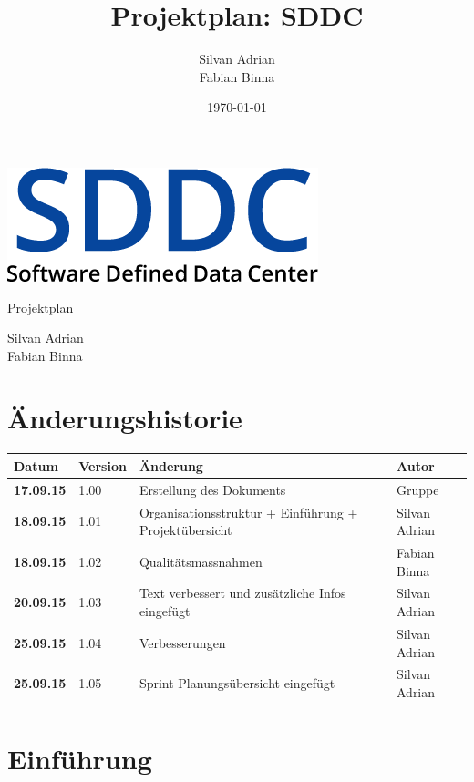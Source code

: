 \documentclass[11pt]{scrartcl}
\title{Projektplan: SDDC}
\author{Silvan Adrian \\ Fabian Binna}
\date{\today{}}
\begin{document}
\def\arraystretch{1.5}
\begin{titlepage}
\begin{center}
\vspace{10em}
\includegraphics[scale=2]{SDDC}
\vspace{10em}
\end{center}
\begin{center}
\huge {Projektplan}
\end{center}
\begin{center}
\vspace{10em}
\LARGE {Silvan Adrian} \\
\LARGE {Fabian Binna}
\end{center}

\end{titlepage}

\newpage
\section{Änderungshistorie}
\begin{tabularx}{\textwidth}{l l X l}
\textbf{Datum} & \textbf{Version} & \textbf{Änderung}  & \textbf{Autor} \\
\hline
\textbf{17.09.15} & 1.00 & Erstellung des Dokuments & Gruppe \\
\textbf{18.09.15} & 1.01 & Organisationsstruktur + Einführung + 
Projektübersicht & Silvan Adrian\\
\textbf{18.09.15} & 1.02 & Qualitätsmassnahmen & Fabian Binna\\
\textbf{20.09.15} & 1.03 &  Text verbessert und zusätzliche Infos eingefügt & Silvan Adrian\\
\textbf{25.09.15} & 1.04 & Verbesserungen & Silvan Adrian\\
\textbf{25.09.15} & 1.05 & Sprint Planungsübersicht eingefügt & Silvan Adrian\\

\end{tabularx}

\newpage
\tableofcontents
\newpage

\section{Einführung}
\end{document}
